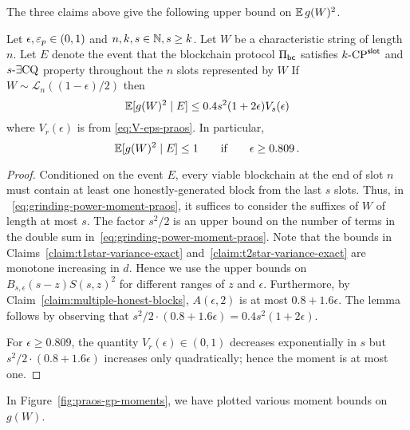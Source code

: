 The three claims above give the following upper bound on $\operatorname{\mathbb{E}} g(W)^2$.


\begin{lemma}\label{lemma:grinding-praos-second-moment}
  Let $\epsilon, \mathsf{\varepsilon}_p \in (0, 1)$ and $n, k, s \in \mathbb{N}, s \geq k$. 
  Let $W$ be a characteristic string of length $n$. 
  Let $E$ denote the event that 
  the blockchain protocol $\Pi_\mathsf{bc}$ 
  satisfies ${k}\text{-}\mathrm{CP}^{\mathsf{slot}}$ and ${s}\text{-}\exists\mathrm{CQ}$ property throughout 
  the $n$ slots represented by $W$   
  If $W  \sim \mathcal{L}_n((1 - \epsilon)/2)$ then
  \begin{equation}\label{eq:grinding-praos-second-moment}
    \operatorname{\mathbb{E}}[ g(W)^2 \mid E] 
    \leq 
      0.4 s^2 (1 + 2\epsilon) V_s(\epsilon)
  \end{equation}
  where $V_r(\epsilon)$ is from \eqref{eq:V-eps-praos}. 
  In particular, 
  $$
    \operatorname{\mathbb{E}} [g(W)^2 \mid E] \leq 1
    \qquad \text{if} \qquad \epsilon \geq 0.809\,.
  $$
\end{lemma}
\noindent
\begin{proof}
  Conditioned on the event $E$, 
  every viable blockchain at the end of slot $n$ 
  must contain at least one honestly-generated block from the last $s$ 
  slots.
  Thus, 
  in ~\eqref{eq:grinding-power-moment-praos}, 
  it suffices to consider the suffixes of $W$ of length at most $s$. 
  The factor $s^2/2$ is an upper bound on 
  the number of terms in the double sum in~\eqref{eq:grinding-power-moment-praos}. 
  Note that the bounds in 
  Claims~\ref{claim:t1star-variance-exact} 
  and~\ref{claim:t2star-variance-exact} are monotone increasing in $d$. 
  Hence we use the upper bounds on $B_{s, \epsilon}(s-z) S(s,z)^2$ for 
  different ranges of $z$ and $\epsilon$. 
  Furthermore, by Claim~\ref{claim:multiple-honest-blocks}, 
  $A(\epsilon, 2)$ is at most $0.8 + 1.6 \epsilon$. 
  The lemma follows by observing that $s^2/2 \cdot (0.8 + 1.6 \epsilon) = 0.4 s^2 (1 + 2 \epsilon)$.

  For $\epsilon \geq 0.809$, 
  the quantity $V_r(\epsilon) \in (0,1)$ decreases exponentially in $s$ 
  but $s^2/2 \cdot (0.8 + 1.6 \epsilon)$ increases only quadratically; 
  hence the moment is at most one.

\end{proof}

In Figure~\ref{fig:praos-gp-moments}, 
we have plotted various moment bounds on $g(W)$.





